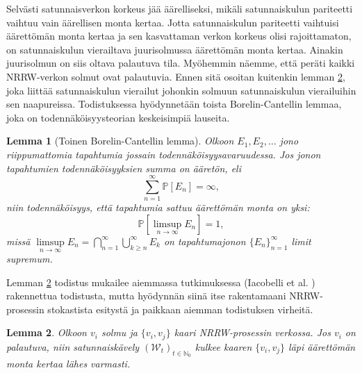 \documentclass[finnish, 12pt, a4paper, sci, utf8, pdfa]{aaltothesis}
\newcommand{\N}{\mathbb{N}}
\newcommand{\Wrandom}{\mathcal{W}}
\newcommand*{\prob}{\mathbb{P}}
\newtheorem{lemma}{Lemma}
\begin{document}
Selvästi satunnaisverkon korkeus jää äärelliseksi, mikäli satunnaiskulun pariteetti vaihtuu vain äärellisen monta kertaa. Jotta satunnaiskulun pariteetti vaihtuisi äärettömän monta kertaa
ja sen kasvattaman verkon korkeus olisi rajoittamaton, on satunnaiskulun vierailtava juurisolmussa äärettömän monta kertaa. Ainakin juurisolmun on siis oltava palautuva tila. Myöhemmin
näemme, että peräti kaikki NRRW-verkon solmut ovat palautuvia. Ennen sitä osoitan kuitenkin lemman \ref{lemma:recurrence}, joka liittää satunnaiskulun vierailut johonkin solmuun 
satunnaiskulun vierailuihin sen naapureissa. Todistuksessa hyödynnetään toista Borelin-Cantellin lemmaa, joka on todennäköisyysteorian keskeisimpiä lauseita.
\begin{lemma}[Toinen Borelin-Cantellin lemma]
   Olkoon $ E_{1}, E_{2}, \ldots $ jono riippumattomia tapahtumia jossain todennäköisyysavaruudessa. Jos jonon tapahtumien todennäköisyyksien summa on ääretön, eli
   \[
      \sum_{n = 1}^{\infty} \prob \left[ E_{n} \right] = \infty,
   \]
   niin todennäköisyys, että tapahtumia sattuu äärettömän monta on yksi:
   \[
      \prob \left[ \limsup \limits_{n \rightarrow \infty} E_{n} \right] = 1,
   \]
   missä $ \limsup \limits_{n \rightarrow \infty} E_{n} = \bigcap_{n = 1}^{\infty} \bigcup_{k \geq n}^{\infty} E_{k} $ on tapahtumajonon $ \{ E_{n} \}_{n=1}^{\infty} $ limit supremum. 
\label{lemma:borel-cantelli}
\end{lemma}

Lemman \ref{lemma:recurrence} todistus mukailee aiemmassa tutkimuksessa (Iacobelli et al. \cite{Iacobelli}) rakennettua todistusta, mutta hyödynnän siinä itse rakentamaani NRRW-prosessin 
stokastista esitystä ja paikkaan aiemman todistuksen virheitä.
\begin{lemma}
Olkoon $ v_{i} $ solmu ja $ \{v_{i}, v_{j}\} $ kaari NRRW-prosessin verkossa. Jos $ v_{i} $ on palautuva, niin satunnaiskävely $ (\Wrandom_{t})_{t \in \N_{0}} $ kulkee kaaren $ \{v_{i}, v_{j}\} $ läpi äärettömän monta kertaa lähes varmasti.
\label{lemma:recurrence}
\end{lemma}
\end{document}
